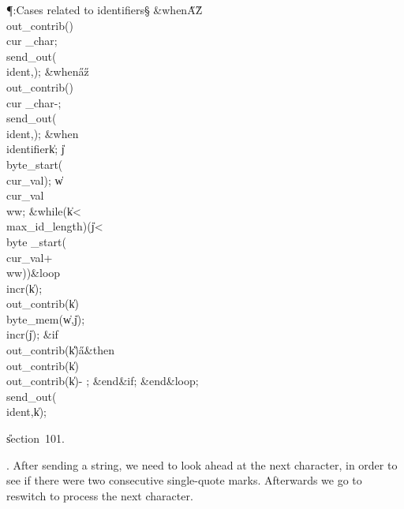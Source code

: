 \Y\P\?\4:Cases related to identifiers\X\S\?\6
\4\&{when}\8\H{A}\?\to\?\H{Z}\KR\8\\{out\_contrib}\?\1(\?\2)\K\?\\{cur%
\_char};\5
\\{send\_out}\?\1(\?\\{ident}\?,\?\2)\?;\6
\4\&{when}\8\H{a}\?\to\?\H{z}\KR\8\\{out\_contrib}\?\1(\?\2)\K\?\\{cur%
\_char}\?-\?;\5
\\{send\_out}\?\1(\?\\{ident}\?,\?\2)\?;\6
\4\&{when}\8\\{identifier}\KR\8\|k\?\K{};\5
\|j\?\K\?\\{byte\_start}\?\1(\?\\{cur\_val}\?\2)\?;\5
\|w\?\K\?\\{cur\_val}\?\?\\{ww};\6
\1\&{while}\?\8\1(\?\|k\?<\?\\{max\_id\_length}\?\2)\W\1(\?\|j\?<\?\\{byte%
\_start}\?\1(\?\\{cur\_val}\?+\?\\{ww}\?\2)\2)\?\8\&{loop}\6
\\{incr}\?\1(\?\|k\?\2)\?;\5
\\{out\_contrib}\?\1(\?\|k\?\2)\K\?\\{byte\_mem}\?\1(\?\|w\?,\?\|j\?\2)\?;\5
\\{incr}\?\1(\?\|j\?\2)\?;\6
\&{if}\1\1\8\\{out\_contrib}\?\1(\?\|k\?\2)\G\?\H{a}\2\8\&{then}\6
\\{out\_contrib}\?\1(\?\|k\?\2)\K\?\\{out\_contrib}\?\1(\?\|k\?\2)-%
\?;\2\6
\&{end}\8\2\&{if}\1;\2\6
\&{end}\8\&{loop};\6
\\{send\_out}\?\1(\?\\{ident}\?,\?\|k\?\2)\?;\par
\U section~101.\fi

. After sending a string, we need to look ahead at the next character, in
order
to see if there were two consecutive single-quote marks. Afterwards we go to
\\{reswitch} to process the next character.

